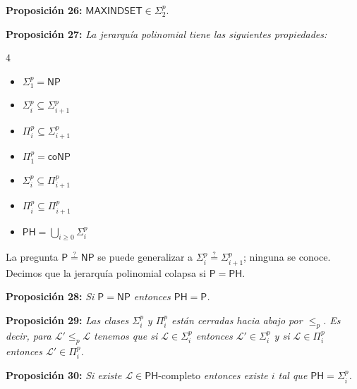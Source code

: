 \documentclass{article}
\begin{document}
\begin{flushleft}
  \textbf{Proposición 26:}
  $\textsf{MAXINDSET} \in \Sigma ^p _2$.
\end{flushleft}

\begin{flushleft}
  \textbf{Proposición 27:}
  \textit{La jerarquía polinomial tiene las siguientes propiedades:}
\end{flushleft}
\begin{multicols}{4}
  \begin{itemize}
    \item $\Sigma^p_1 = \mathsf{NP}$
    \item $\Sigma^p_i \subseteq \Sigma^p_{i+1}$
    \item $\Pi^p_i \subseteq \Sigma^p_{i+1}$
    \item $\Pi^p_1 = \mathsf{coNP}$
    \item $\Sigma^p_i \subseteq \Pi^p_{i+1}$
    \item $\Pi^p_i \subseteq \Pi^p_{i+1}$
    \item $\mathsf{PH} = \bigcup_{i \geq 0} \Sigma^p_{i}$
  \end{itemize}
\end{multicols}
\begin{flushleft}
  La pregunta $\mathsf{P} \stackrel{?}{=} \mathsf{NP}$ se puede generalizar a $\Sigma^p_i \stackrel{?}{=} 
  \Sigma^p_{i+1}$; ninguna se conoce. Decimos que la jerarquía polinomial colapsa si $\mathsf{P} = \mathsf{PH}$.
\end{flushleft}

\begin{flushleft}
  \textbf{Proposición 28:}
  \textit{Si $\mathsf{P} = \mathsf{NP}$ entonces $\mathsf{PH} = \mathsf{P}$.}
\end{flushleft}

\begin{flushleft}
  \textbf{Proposición 29:}
  \textit{Las clases $\Sigma^p_i$ y $\Pi^p_i$ están cerradas hacia abajo por $\leq_p$. Es decir, para $
  \mathcal{L}' \leq_p \mathcal{L}$ tenemos que si $\mathcal{L} \in \Sigma^p_i$ entonces $\mathcal{L}' \in 
  \Sigma^p_i$ y si $\mathcal{L} \in \Pi^p_i$ entonces $\mathcal{L}' \in \Pi^p_i$.}
\end{flushleft}

\begin{flushleft}
  \textbf{Proposición 30:}
  \textit{Si existe $\mathcal{L} \in \mathsf{PH}$}-completo \textit{entonces existe $i$ tal que $\mathsf{PH}
  = \Sigma^p_i$.}
\end{flushleft}
\end{document}
